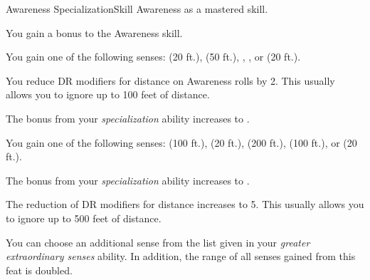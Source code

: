     \begin{feat}{Awareness Specialization}{Skill}
        \featpre Awareness as a mastered skill.

         You gain a  bonus to the Awareness skill.

         You gain one of the following senses:  (20 ft.),  (50 ft.), , , or  (20 ft.).

         You reduce DR modifiers for distance on Awareness rolls by 2.
        This usually allows you to ignore up to 100 feet of distance.

         The bonus from your \textit{specialization} ability increases to .

         You gain one of the following senses:  (100 ft.),  (20 ft.),  (200 ft.),  (100 ft.), or  (20 ft.).

         The bonus from your \textit{specialization} ability increases to .

         The reduction of DR modifiers for distance increases to 5.
        This usually allows you to ignore up to 500 feet of distance.

         You can choose an additional sense from the list given in your \textit{greater extraordinary senses} ability.
        In addition, the range of all senses gained from this feat is doubled.
    \end{feat}

